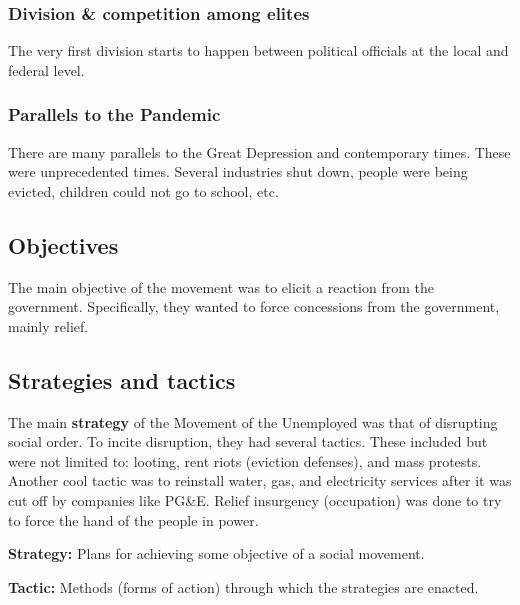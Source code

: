 \subsubsection{Division \& competition among elites}
The very first division starts to happen between political officials at the local and federal level.

\subsubsection{Parallels to the Pandemic}
There are many parallels to the Great Depression and contemporary times.
These were unprecedented times.
Several industries shut down, people were being evicted, children could not go to school, etc.

\subsection{Objectives}
The main objective of the movement was to elicit a reaction from the government.
Specifically, they wanted to force concessions from the government, mainly relief.

\subsection{Strategies and tactics}
The main \textbf{strategy} of the Movement of the Unemployed was that of disrupting social order.
To incite disruption, they had several tactics.
These included but were not limited to: looting, rent riots (eviction defenses), and mass protests.
Another cool tactic was to reinstall water, gas, and electricity services after it was cut off by companies like PG\&E.
Relief insurgency (occupation) was done to try to force the hand of the people in power.

\noindent \textbf{Strategy:} Plans for achieving some objective of a social movement. 

\noindent \textbf{Tactic:} Methods (forms of action) through which the strategies are enacted.



